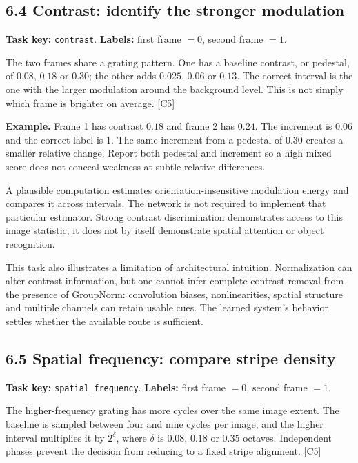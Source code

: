 \documentclass[
  11pt,
]{article}
\let\oldsubsection\subsection
\renewcommand{\subsection}{\Needspace{6\baselineskip}\oldsubsection}
\begin{document}
\subsection{6.4 Contrast: identify the stronger
modulation}\label{contrast-identify-the-stronger-modulation}

\textbf{Task key:} \texttt{contrast}. \textbf{Labels:} first frame
\(=0\), second frame \(=1\).

The two frames share a grating pattern. One has a baseline contrast, or
pedestal, of \(0.08\), \(0.18\) or \(0.30\); the other adds \(0.025\),
\(0.06\) or \(0.13\). The correct interval is the one with the larger
modulation around the background level. This is not simply which frame
is brighter on average. {[}C5{]}

\textbf{Example.} Frame 1 has contrast \(0.18\) and frame 2 has
\(0.24\). The increment is \(0.06\) and the correct label is 1. The same
increment from a pedestal of \(0.30\) creates a smaller relative change.
Report both pedestal and increment so a high mixed score does not
conceal weakness at subtle relative differences.

A plausible computation estimates orientation-insensitive modulation
energy and compares it across intervals. The network is not required to
implement that particular estimator. Strong contrast discrimination
demonstrates access to this image statistic; it does not by itself
demonstrate spatial attention or object recognition.

This task also illustrates a limitation of architectural intuition.
Normalization can alter contrast information, but one cannot infer
complete contrast removal from the presence of GroupNorm: convolution
biases, nonlinearities, spatial structure and multiple channels can
retain usable cues. The learned system's behavior settles whether the
available route is sufficient.

\subsection{6.5 Spatial frequency: compare stripe
density}\label{spatial-frequency-compare-stripe-density}

\textbf{Task key:} \texttt{spatial\_frequency}. \textbf{Labels:} first
frame \(=0\), second frame \(=1\).

The higher-frequency grating has more cycles over the same image extent.
The baseline is sampled between four and nine cycles per image, and the
higher interval multiplies it by \(2^\delta\), where \(\delta\) is
\(0.08\), \(0.18\) or \(0.35\) octaves. Independent phases prevent the
decision from reducing to a fixed stripe alignment. {[}C5{]}
\end{document}
